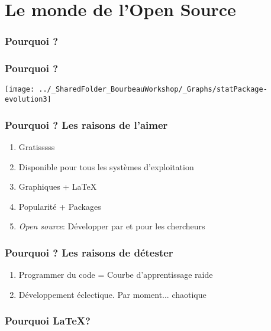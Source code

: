 \documentclass{beamer}
\begin{document}
\section{Le monde \vspace{0.3cm} de l'Open Source}

    \begin{frame}
        \frametitle{Pourquoi \R?}  \vspace{1.2cm}
    \end{frame}

    \begin{frame}
        \frametitle{Pourquoi \R?}  \vspace{1.2cm}
        \begin{center}
            \texttt{[image: ../\_SharedFolder\_BourbeauWorkshop/\_Graphs/statPackage-evolution3]}
        \end{center} 
    \end{frame}
    
    \begin{frame}
        \frametitle{Pourquoi \R? Les raisons de l'aimer}
        \begin{enumerate}
            \item{Gratisssss}
            \item{Disponible pour tous les systèmes d'exploitation}
            \item{Graphiques + \LaTeX}
            \item{Popularité + Packages}
            \item{\emph{Open source}: Développer par et pour les chercheurs}
        \end{enumerate}
    \end{frame}
    
    \begin{frame}
        \frametitle{Pourquoi \R? Les raisons de détester}
        \begin{enumerate}
            \item{Programmer du code = Courbe d'apprentissage raide}
            \item{Développement éclectique. Par moment... chaotique}
        \end{enumerate}
    \end{frame}
    


    \begin{frame}
        \frametitle{Pourquoi \LaTeX?} \vspace{1cm}   
    \end{frame}
    
\end{document}

